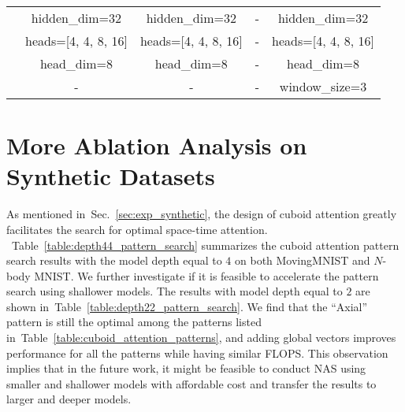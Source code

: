 \documentclass{article}
\newcommand{\tabref}[1]{Table~\ref{#1}}
\newcommand{\secref}[1]{Sec.~\ref{#1}}
\def\nbody{$N$-body MNIST}
\begin{document}
\begin{table}[!tb]
\begin{center}
{\begin{tabular}{l|c|c|c|c}
   & hidden\_dim=32 & hidden\_dim=32    & -    & hidden\_dim=32 \\
   & heads=[4, 4, 8, 16] & heads=[4, 4, 8, 16] & - & heads=[4, 4, 8, 16] \\
   & head\_dim=8 & head\_dim=8 & - & head\_dim=8 \\
   & - & - & - & window\_size=3 \\
	\bottomrule[1.5pt]
	\end{tabular}
	}  \end{center}
\end{table}





\section{More Ablation Analysis on Synthetic Datasets}
As mentioned in~\secref{sec:exp_synthetic}, the design of cuboid attention greatly facilitates the search for optimal space-time attention. 
~\tabref{table:depth44_pattern_search} summarizes the cuboid attention pattern search results with the model depth equal to $4$ on both MovingMNIST and \nbody{}. 
We further investigate if it is feasible to accelerate the pattern search using shallower models. 
The results with model depth equal to $2$ are shown in~\tabref{table:depth22_pattern_search}. 
We find that the ``Axial'' pattern is still the optimal among the patterns listed in~\tabref{table:cuboid_attention_patterns}, and adding global vectors improves performance for all the patterns while having similar FLOPS. 
This observation implies that in the future work, it might be feasible to conduct NAS using smaller and shallower models with affordable cost and transfer the results to larger and deeper models.
\end{document}

